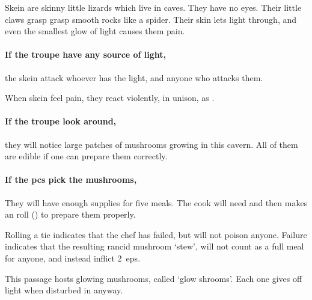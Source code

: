 \begin{multicols}{2}



\begin{exampletext}
  Skein are skinny little lizards which live in caves.
  They have no eyes.
  Their little claws grasp grasp smooth rocks like a spider.
  Their skin lets light through, and even the smallest glow of light causes them pain.
\end{exampletext}

\paragraph{If the troupe have any source of light,}
the skein attack whoever has the light, and anyone who attacks them.

When skein feel pain, they react violently, in unison, as .

\skeinSwarm

\paragraph{If the troupe look around,}
they will notice large patches of mushrooms growing in this cavern.
All of them are edible if one can prepare them correctly.

\paragraph{If the \glspl{pc} pick the mushrooms,}
They will have enough supplies for five meals.
The cook will need  and then makes an  roll (\tn[10]) to prepare them properly.

Rolling a tie indicates that the chef has failed, but will not poison anyone.
Failure indicates that the resulting rancid mushroom `stew', will not count as a full meal for anyone, and instead inflict 2~\glspl{ep}.



This passage hosts glowing mushrooms, called `glow shrooms'.%
Each one gives off light when disturbed in anyway.


\end{multicols}
